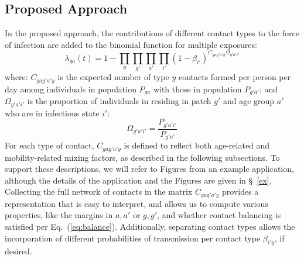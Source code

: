 \subsection{Proposed Approach}\label{meth.prop}
In the proposed approach, the contributions of different contact types to the force of infection
are added to the binomial function for multiple exposures:
\begin{equation}
  \lambda_{ga}(t) = 1 - \prod_{y}\prod_{g'}\prod_{a'}\prod_{i'} {\left(1 - \beta_{i'}\right)}
  ^{C_{gag'a'y} \Omega_{g'a'i'}}
\end{equation}
where:
$C_{gag'a'y}$ is the expected number of type $y$ contacts formed per person per day
among individuals in population $P_{ga}$ with those in population $P_{g'a'}$;
and $\Omega_{g'a'i'}$ is the proportion of individuals in residing in patch $g'$ and age group $a'$
who are in infectious state $i'$:
\begin{equation}
  \Omega_{g'a'i'} = \frac{P_{g'a'i'}}{P_{g'a'}}
\end{equation}
For each type of contact, $C_{gag'a'y}$ is defined to reflect
both age-related and mobility-related mixing factors,
as described in the following subsections.
To support these descriptions, we will refer to Figures from an example application,
although the details of the application and the Figures are given in \S~\ref{ex}.
Collecting the full network of contacts in the matrix $C_{gag'a'y}$
provides a representation that is easy to interpret,
and allows us to compute various properties, like the margins in $a,a'$ or $g,g'$,
and whether contact balancing is satisfied per Eq.~(\ref{eq:balance}).
Additionally, separating contact types allows the incorporation of
different probabilities of transmission per contact type $\beta_{i'y}$, if desired.
